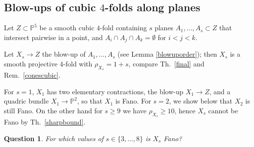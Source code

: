 \documentclass[a4paper,12pt]{amsart}
\newtheorem{question}[thm]{Question}
\theoremstyle{definition}
\numberwithin{figure}{section}
\numberwithin{table}{section}
\newcommand{\pr}{\mathbb{P}}
\begin{document}
\subsection{Blow-ups of cubic $4$-folds along planes}\label{excubics}
\noindent Let  $Z\subset\pr^5$ be a smooth cubic $4$-fold containing $s$ planes
$A_1,\dotsc,A_s\subset Z$ that intersect pairwise in a point, and $A_i\cap A_j\cap A_k=\emptyset$ for $i<j<k$.

Let $X_s\to Z$ the blow-up of $A_1,\dotsc,A_s$ (see Lemma \ref{blowuporder});
then $X_s$ is a smooth projective $4$-fold with $\rho_{X_s}=1+s$, compare Th.~\ref{final} and Rem.~\ref{conescubic}.

For $s=1$, $X_1$ has two elementary contractions, the blow-up $X_1\to Z$, and a quadric bundle $X_1\to\pr^2$, so that $X_1$ is Fano. For $s=2$, we show below that $X_2$ is still Fano. 
On the other hand
for $s\geq 9$ we have $\rho_{X_s}\geq 10$, hence $X_s$ cannot be Fano by Th.~\ref{sharpbound}.  
  \begin{question}\label{questioncubic}
    For which values of $s\in\{3,\dotsc,8\}$ is $X_s$ Fano?
\end{question}
\end{document}
